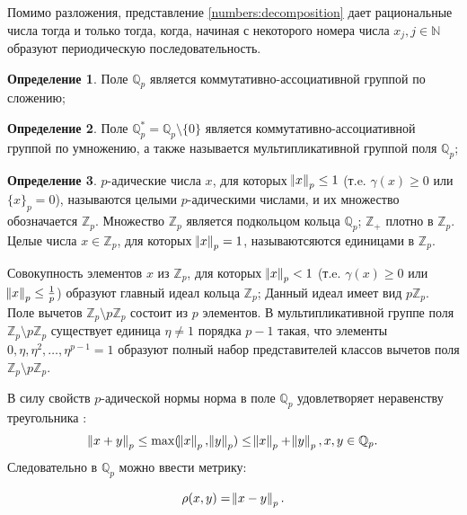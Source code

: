 \documentclass[master, och, diploma, times]{sty/SCWorks}
\theoremstyle{plain}
\theoremstyle{definition}
\newtheorem{defn}{Определение}[section]
\numberwithin{equation}{section}
\begin{document}
Помимо разложения, представление \eqref{numbers:decomposition} дает рациональные числа тогда и только тогда, когда, начиная с некоторого номера числа $x_j, j \in \mathbb{N}$ образуют периодическую последовательность.

\begin{defn}
Поле $\mathbb {Q}_p$ является коммутативно-ассоциативной группой по сложению;
\end{defn}

\begin{defn}
Поле $\mathbb {Q}_p^*=\mathbb {Q}_p \setminus \{0\}$ является коммутативно-ассоциативной группой по умножению, а также называется мультипликативной группой поля $\mathbb {Q}_p$\cite{bib:analysis:baker};
\end{defn}

\begin{defn}
$p$-адические числа $x$, для которых $\norm{x}_p \le 1$ (т.e. $\gamma(x) \ge 0$ или $\{x\}_p=0$), называются целыми $p$-адическими числами, и их множество обозначается $\mathbb {Z}_p$. Множество $\mathbb {Z}_p$ является подкольцом кольца $\mathbb {Q}_p$; $\mathbb {Z}_+$ плотно в $\mathbb {Z}_p$. Целые числа $x \in \mathbb {Z}_p$, для которых $\norm{x}_p=1$, называютсяются единицами в $\mathbb {Z}_p$. \cite{bib:analysis:vladimirov}
\end{defn}

Совокупность элементов $x$ из $\mathbb {Z}_p$, для которых $\norm{x}_p < 1$ (т.e. $\gamma(x) \ge 0$ или $\norm{x}_p \le \frac{1}{p}$) образуют главный идеал кольца $\mathbb {Z}_p$; Данный идеал имеет вид $p\mathbb {Z}_p$. Поле вычетов $\mathbb {Z}_p \setminus p\mathbb {Z}_p$ состоит из $p$ элементов. В мультипликативной группе поля $\mathbb {Z}_p \setminus p\mathbb {Z}_p$ существует единица $\eta \ne 1$ порядка $p-1$ такая, что элементы $0, \eta, \eta^2, \dots, \eta^{p-1} = 1$ образуют полный набор представителей классов вычетов поля $\mathbb {Z}_p \setminus p\mathbb {Z}_p$.

В силу свойств $p$-адической нормы норма в поле $\mathbb {Q}_p$ удовлетворяет неравенству треугольника \cite{bib:analisys:albeverio}:
\begin{equation}
\norm{x + y}_p \le \max(\norm{x}_p, \norm{y}_p) \le \norm{x}_p + \norm{y}_p, x,y \in \mathbb {Q}_p.
\end{equation}
\noindent Следовательно в $\mathbb {Q}_p$ можно ввести метрику:

\begin{equation}
	\rho (x,y)=\norm{x-y}_p.
\end{equation}
\end{document}
